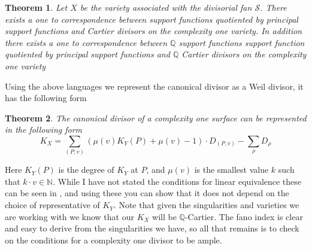 \documentclass[12pt,a4paper]{book}      %
\newtheorem{thm}{Theorem}[section]
\theoremstyle{definition}
\begin{document}
\begin{thm}\cite{Suss}
Let $X$ be the variety associated with the divisorial fan $\mathcal{S}$. There exists a one to correspondence between support functions quotiented by principal support functions and Cartier divisors on the complexity one variety. In addition there exists 
a one to correspondence between $\mathbb{Q}$ support functions support function quotiented by principal support functions and $\mathbb{Q}$ Cartier divisors on the complexity one variety

\end{thm}
Using the above languages we represent the canonical divisor as a Weil divisor, it has the following form
\begin{thm}\cite{Suss}
The canonical divisor of a complexity one surface can be represented in the following form
\[
K_X = \sum_{(P, v)} ( \mu (v) K_Y (P) + \mu (v) - 1) \cdot D_{(P,v)} - \sum_\rho D_\rho
\]
\end{thm}
Here $K_Y(P)$ is the degree of $K_Y$ at $P$, and $\mu (v)$ is the smallest value $k$ such that $k \cdot v \in \mathbb{N}$.  While I have not stated the conditions for linear equivalence these can be seen in \cite{Suss}, and using these you can show that it does not depend on the choice of representative of $K_Y$. Note that given the singularities and varieties we are working with we know that our $K_X$ will be $\mathbb{Q}$-Cartier. The fano index is clear and easy to derive from the singularities we have, so all that remains is to check on the conditions for a complexity one divisor to be ample.
\end{document}
